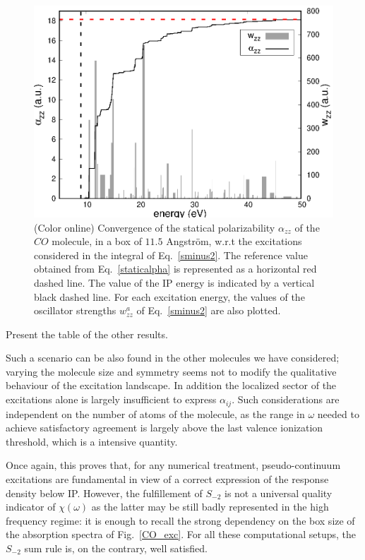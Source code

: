 \documentclass[reprint,aps,prb]{revtex4-1}
\renewcommand{\AA}{{Angstr\"om}}
\begin{document}
\begin{figure}
\includegraphics[scale=0.6]{Fig6_CO_statPolvsExc.eps}
\caption{\label{co_AlphaExc}(Color online) Convergence of the statical polarizability $\alpha_{zz}$ of the $CO$ molecule, in a box of $11.5$ \AA,
w.r.t the excitations considered in the integral of Eq.~\eqref{sminus2}. The reference value obtained from Eq.~\eqref{staticalpha} is represented as a
horizontal red dashed line. The value of the IP energy is indicated by a vertical black dashed line. For each excitation energy, the values of the
oscillator strengths $w^a_{zz}$ of Eq.~\eqref{sminus2} are also plotted. }
\end{figure}

Present the table of the other results.

Such a scenario can be also found in the other molecules we have considered;
varying the molecule size and symmetry seems not to modify the qualitative behaviour of the excitation landscape. In addition the
localized sector of the excitations alone is largely insufficient to express $\alpha_{ij}$.
Such considerations are independent on the number of atoms of the molecule, as the range in $\omega$ needed to
achieve satisfactory agreement is largely above the last valence ionization threshold, which is
a intensive quantity.

Once again, this proves that, for any numerical treatment,  pseudo-continuum excitations are fundamental in view of a correct expression
of the response density below IP.
However, the fulfillement of $S_{-2}$ is not a universal quality indicator of $\chi(\omega)$ as the latter may be still badly represented in the high frequency regime:
it is enough to recall
the strong dependency on the box size of the absorption spectra of Fig.~\ref{CO_exc}.
For all these computational setups, the $S_{-2}$ sum rule is, on the contrary, well satisfied.
\end{document}
